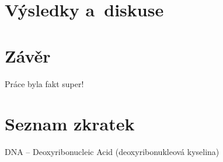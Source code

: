 \newpage
\section{Výsledky a~diskuse}































\newpage
\section{Závěr}
Práce byla fakt super!































\newpage
\renewcommand{\refname}{Použitá literatura}


\newpage
\listoffigures

\newpage
\listoftables

\newpage
\section{Seznam zkratek}
{\setlength{\parindent}{0cm} %

DNA -- Deoxyribonucleic Acid (deoxyribonukleová kyselina)

}